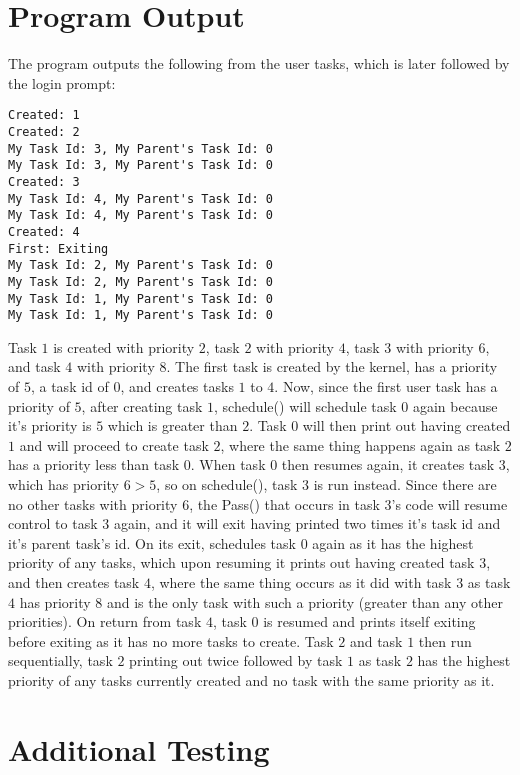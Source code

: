 \documentclass[12pt]{article}
\begin{document}
\section{Program Output}
The program outputs the following from the user tasks, which is later followed by the login prompt:
\begin{verbatim}
Created: 1
Created: 2
My Task Id: 3, My Parent's Task Id: 0
My Task Id: 3, My Parent's Task Id: 0
Created: 3
My Task Id: 4, My Parent's Task Id: 0
My Task Id: 4, My Parent's Task Id: 0
Created: 4
First: Exiting
My Task Id: 2, My Parent's Task Id: 0
My Task Id: 2, My Parent's Task Id: 0
My Task Id: 1, My Parent's Task Id: 0
My Task Id: 1, My Parent's Task Id: 0
\end{verbatim}
Task $1$ is created with priority $2$, task $2$ with priority $4$, task $3$ with priority $6$, and task $4$ with priority $8$.  The first task is created by the kernel, has a priority of $5$, a task id of $0$, and creates tasks $1$ to $4$.  Now, since the first user task has a priority of $5$, after creating task $1$, \textmd{schedule()} will schedule task $0$ again because it's priority is $5$ which is greater than $2$.  Task $0$ will then print out having created $1$ and will proceed to create task $2$, where the same thing happens again as task $2$ has a priority less than task $0$.  When task $0$ then resumes again, it creates task $3$, which has priority $6 > 5$, so on \textmd{schedule()}, task $3$ is run instead.  Since there are no other tasks with priority $6$, the \textmd{Pass()} that occurs in task $3$'s code will resume control to task $3$ again, and it will exit having printed two times it's task id and it's parent task's id.  On its exit,  schedules task $0$ again as it has the highest priority of any tasks, which upon resuming it prints out having created task $3$, and then creates task $4$, where the same thing occurs as it did with task $3$ as task $4$ has priority $8$ and is the only task with such a priority (greater than any other priorities).  On return from task $4$, task $0$ is resumed and prints itself exiting before exiting as it has no more tasks to create.  Task $2$ and task $1$ then run sequentially, task $2$ printing out twice followed by task $1$ as task $2$ has the highest priority of any tasks currently created and no task with the same priority as it. \\[2\baselineskip]


\section{Additional Testing}
\end{document}
